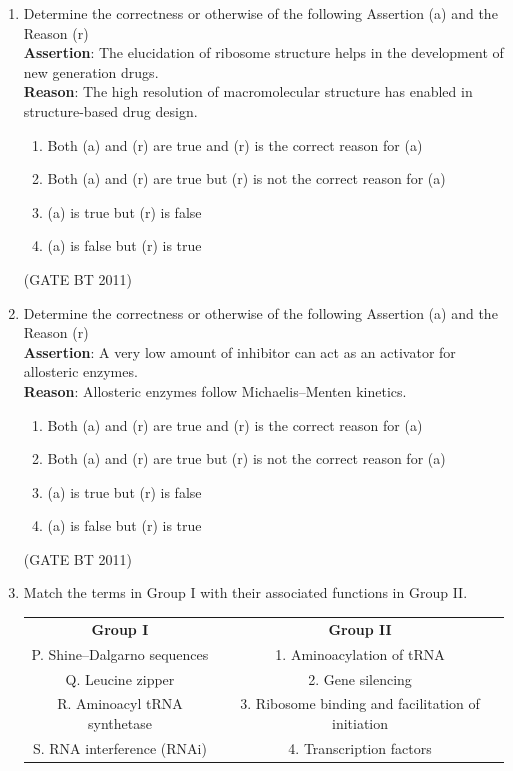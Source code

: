 \documentclass[journal,12pt,onecolumn]{IEEEtran}
\begin{document}
\begin{enumerate}
  \item Determine the correctness or otherwise of the following Assertion (a) and the Reason (r) \\
  \textbf{Assertion}: The elucidation of ribosome structure helps in the development of new generation drugs. \\
  \textbf{Reason}: The high resolution of macromolecular structure has enabled in structure-based drug design. 

    \begin{enumerate}
      \item Both (a) and (r) are true and (r) is the correct reason for (a)
      \item Both (a) and (r) are true but (r) is not the correct reason for (a)
      \item(a) is true but (r) is false
      \item (a) is false but (r) is true
    \end{enumerate}
    \hfill(GATE BT 2011)

  \item Determine the correctness or otherwise of the following Assertion (a) and the Reason (r) \\
  \textbf{Assertion}: A very low amount of inhibitor can act as an activator for allosteric enzymes. \\
  \textbf{Reason}: Allosteric enzymes follow Michaelis--Menten kinetics. 

  
    \begin{enumerate}
      \item Both (a) and (r) are true and (r) is the correct reason for (a)
      \item Both (a) and (r) are true but (r) is not the correct reason for (a)
      \item (a) is true but (r) is false
      \item (a) is false but (r) is true
    \end{enumerate}
    \hfill(GATE BT 2011)
  

  \item Match the terms in Group I with their associated functions in Group II. 

  \begin{table}[H]
  \centering
  \begin{tabular}{c c}
    \textbf{Group I} & \textbf{Group II} \\
    P. Shine–Dalgarno sequences & 1. Aminoacylation of tRNA \\
    Q. Leucine zipper & 2. Gene silencing \\
    R. Aminoacyl tRNA synthetase & 3. Ribosome binding and facilitation of initiation \\
    S. RNA interference (RNAi) & 4. Transcription factors \\
  \end{tabular}
  \end{table}


\end{enumerate}
\end{document}
